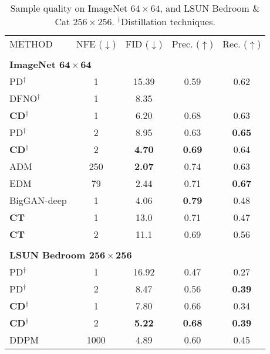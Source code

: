 \begin{table*}
\begin{minipage}[t]{0.49\linewidth}
	\caption{Sample quality on ImageNet $64\times 64$, and LSUN Bedroom \& Cat $256\times 256$. $^\dagger$Distillation techniques. }\label{tab:results2}
	\centering
	{\setlength{\extrarowheight}{1.5pt}
	\begin{adjustbox}{max width=\linewidth}
	\begin{tabular}{lcccc}
	    \Xhline{3\arrayrulewidth}
        METHOD & NFE ($\downarrow$) & FID ($\downarrow$) & Prec. ($\uparrow$) & Rec. ($\uparrow$) \\
        \\[-2ex]
        \multicolumn{5}{l}{\textbf{ImageNet $\bm{64\times 64}$}}\\
        \Xhline{3\arrayrulewidth}
        PD$^\dagger$ \cite{salimans2022progressive} & 1 & 15.39 & 0.59 & 0.62\\
        DFNO$^{\dagger}$ \cite{zheng2022fast} & 1 & 8.35 & & \\
        \textbf{CD}$^\dagger$ & 1 & 6.20 & 0.68 & 0.63\\
        PD$^\dagger$ \cite{salimans2022progressive} & 2 & 8.95  & 0.63 & \textbf{0.65}\\
        \textbf{CD}$^\dagger$ & 2 & \textbf{4.70} & \textbf{0.69} & 0.64\\
        \hline
        ADM
        \cite{dhariwal2021diffusion}
        & 250 & \textbf{2.07} & 0.74 & 0.63 \\
        EDM
        \cite{karras2022edm}
        & 79 & 2.44 & 0.71 & \textbf{0.67} \\
        BigGAN-deep
        \cite{brock2018large}
        & 1 & 4.06 & \textbf{0.79} & 0.48 \\
        \textbf{CT} & 1 & 13.0 & 0.71 & 0.47\\
        \textbf{CT} & 2 & 11.1 & 0.69 & 0.56\\
        \\[-2ex]
        \multicolumn{5}{l}{\textbf{LSUN Bedroom $\bm{256\times 256}$}}\\
        \Xhline{3\arrayrulewidth}
        PD$^\dagger$ \cite{salimans2022progressive} & 1 & 16.92 & 0.47 & 0.27\\
        PD$^\dagger$ \cite{salimans2022progressive} & 2 & 8.47 & 0.56 & \textbf{0.39} \\
        \textbf{CD}$^\dagger$ & 1 & 7.80 & 0.66 & 0.34\\
        \textbf{CD}$^\dagger$ & 2 & \textbf{5.22} & \textbf{0.68} & \textbf{0.39}\\
        \hline
        DDPM
        \cite{ho2020denoising}
        & 1000 & 4.89 & 0.60 & 0.45\\

\end{tabular}
\end{adjustbox}}
\end{minipage}
\end{table*}
